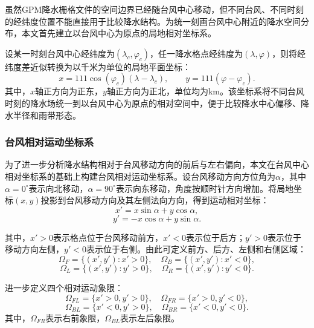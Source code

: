 \documentclass[UTF8,a4paper,zihao=5]{ctexart}
\numberwithin{equation}{section}
\numberwithin{figure}{section}
\numberwithin{table}{section}
\begin{document}
虽然GPM降水栅格文件的空间边界已经随台风中心移动，但不同台风、不同时刻的经纬度位置不能直接用于比较降水结构。为统一刻画台风中心附近的降水空间分布，本文首先建立以台风中心为原点的局地相对坐标系。

设某一时刻台风中心经纬度为$(\lambda_c,\varphi_c)$，任一降水格点经纬度为$(\lambda,\varphi)$，则将经纬度差近似转换为以千米为单位的局地平面坐标：
\begin{equation}
    x=111\cos(\varphi_c)(\lambda-\lambda_c),
    \qquad
    y=111(\varphi-\varphi_c).
\end{equation}
其中，$x$轴正方向为正东，$y$轴正方向为正北，单位均为km。该坐标系将不同台风时刻的降水场统一到以台风中心为原点的相对空间中，便于比较降水中心偏移、降水半径和雨带形态。

\subsubsection{台风相对运动坐标系}

为了进一步分析降水结构相对于台风移动方向的前后与左右偏向，本文在台风中心相对坐标系的基础上构建台风相对运动坐标系。设台风移动方向方位角为$\alpha$，其中$\alpha=0^\circ$表示向北移动，$\alpha=90^\circ$表示向东移动，角度按顺时针方向增加。将局地坐标$(x,y)$投影到台风移动方向及其左侧法向方向，得到运动相对坐标：
\begin{equation}
    x'=x\sin\alpha+y\cos\alpha,
\end{equation}
\begin{equation}
    y'=-x\cos\alpha+y\sin\alpha.
\end{equation}

其中，$x'>0$表示格点位于台风移动前方，$x'<0$表示位于后方；$y'>0$表示位于移动方向左侧，$y'<0$表示位于右侧。由此可定义前方、后方、左侧和右侧区域：
\begin{equation}
    \Omega_F=\{(x',y'):x'>0\},\quad
    \Omega_B=\{(x',y'):x'<0\},
\end{equation}
\begin{equation}
    \Omega_L=\{(x',y'):y'>0\},\quad
    \Omega_R=\{(x',y'):y'<0\}.
\end{equation}

进一步定义四个相对运动象限：
\begin{equation}
    \Omega_{FL}=\{x'>0,y'>0\},\quad
    \Omega_{FR}=\{x'>0,y'<0\},
\end{equation}
\begin{equation}
    \Omega_{BL}=\{x'<0,y'>0\},\quad
    \Omega_{BR}=\{x'<0,y'<0\}.
\end{equation}
其中，$\Omega_{FR}$表示右前象限，$\Omega_{BL}$表示左后象限。
\end{document}
